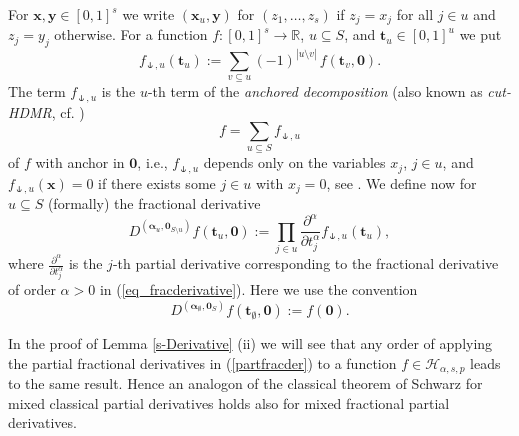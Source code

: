 \documentclass[12pt]{article}
\newcommand{\bsx}{\boldsymbol{x}}
\newcommand{\bst}{\boldsymbol{t}}
\newcommand{\bsy}{\boldsymbol{y}}
\newcommand{\bsalpha}{\boldsymbol{\alpha}}
\newcommand{\bszero}{\boldsymbol{0}}
\newcommand{\RR}{\mathbb{R}}
\newcommand{\HH}{\mathcal{H}}
\begin{document}
For $\bsx, \bsy\in [0,1]^s$ we write 
$(\bsx_u,\bsy)$ for $(z_1,\ldots,z_s)$
if $z_j=x_j$ for all $j\in u$ and $z_j = y_j$ otherwise.
For a function $f:[0,1]^s\to \RR$, $u\subseteq S$, and 
$\bst_u\in [0,1]^{u}$ we put
\begin{equation*}
f_{\forksnot, u}(\bst_u) := \sum_{v\subseteq u} (-1)^{|u\setminus v|}\,
f(\bst_v, \bszero).
\end{equation*}
The term $f_{\forksnot, u}$ is the $u$-th term of the
\emph{anchored decomposition} (also known as \emph{cut-HDMR}, cf. \cite{RA99}) 
$$
f=\sum_{u\subseteq S} f_{\forksnot, u}
$$ 
of
$f$ with anchor in $\bszero$, i.e., $f_{\forksnot, u}$ depends only on the variables $x_j$, $j\in u$, and  $f_{\forksnot, u}(\bsx) = 0$ if there exists  some $j\in u$ with $x_j=0$, see \cite{KSWW10}.
We define now for $u\subseteq S$ (formally) the fractional
derivative
\begin{equation}
\label{partfracder}
D^{(\bsalpha_u, \bszero_{S\setminus u})}f(\bst_u, \bszero) :=
\prod_{j\in u} \frac{\partial^{\alpha}}{\partial t^\alpha_j}
f_{\forksnot, u}(\bst_u),
\end{equation}
where
$\frac{\partial^{\alpha}}{\partial t_j^\alpha}$ is the $j$-th partial
derivative corresponding to the fractional derivative of order
$\alpha>0$ in (\ref{eq_fracderivative}).
Here we use the convention
\begin{equation*}
D^{(\bsalpha_\emptyset, \bszero_{S})}f(\bst_\emptyset,\bszero) 
:= f(\bszero).
\end{equation*}

In the proof of Lemma \ref{s-Derivative} (ii) we will see that any 
order of applying
the partial fractional derivatives in (\ref{partfracder}) to a
function $f\in \HH_{\alpha,s,p}$ leads to the same result. Hence an
analogon of the classical theorem of Schwarz for mixed classical
partial derivatives holds also for mixed fractional partial derivatives.
\end{document}
